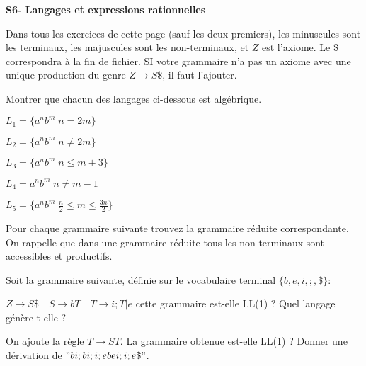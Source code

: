 \documentclass[french]{article}
\begin{document}
\begin{center}
    \huge{\textbf{S6- Langages et expressions rationnelles}}
\end{center}

Dans tous les exercices de cette page (sauf les deux premiers), les minuscules sont les terminaux,
les majuscules sont les non-terminaux, et \(Z\) est l'axiome. Le \(\$\) correspondra à la fin
de fichier. SI votre grammaire n'a pas un axiome avec une unique production du genre \(Z\to S\$\),
il faut l'ajouter.

\begin{exo}
    Montrer que chacun des langages ci-dessous est algébrique.
    \begin{q}{1}
        \(L_1=\{a^nb^m|n=2m\}\)
    \end{q}
    \begin{q}{2}
        \(L_2=\{a^nb^m|n\neq 2m\}\)
    \end{q}
    \begin{q}{3}
        \(L_3=\{a^nb^m|n\leq m+3\}\)
    \end{q}
    \begin{q}{4}
        \(L_4=a^nb^m|n\neq m-1\)
    \end{q}
    \begin{q}{5}
        \(L_5=\{a^nb^m| \frac{n}{2}\leq m\leq \frac{3n}{2}\}\)
    \end{q}
\end{exo}

\begin{exo}
    Pour chaque grammaire suivante trouvez la grammaire réduite correspondante. On rappelle
    que dans une grammaire réduite tous les non-terminaux sont accessibles et productifs.
    \begin{q}{1}
    \end{q}
    \begin{q}{2}
    \end{q}
\end{exo}

\begin{exo}
    Soit la grammaire suivante, définie sur le vocabulaire terminal \(\{b,e,i,;,\$\}\):
    \begin{q}{1}
        \(Z\to S\$\quad S\to bT\quad T\to i;T|e\) cette grammaire est-elle LL(1) ? Quel
        langage génère-t-elle ?
    \end{q}
    \begin{q}{2}
        On ajoute la règle \(T\to ST\). La grammaire obtenue est-elle LL(1) ? Donner une dérivation
        de \("bi;bi;i;ebei;i;e\$"\).
    \end{q}
\end{exo}
\end{document}
